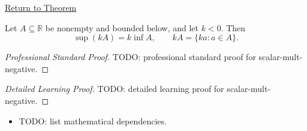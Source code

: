 \newpage
{}
\label{prf:scalar-mult-negative}

\begin{remark*}[Return]
\hyperref[thm:scalar-mult-negative]{Return to Theorem}
\end{remark*}

\begin{theorem*}
Let $A\subseteq\mathbb{R}$ be nonempty and bounded below, and let $k<0$. Then
\[
  \sup(kA)=k\inf A,
  \qquad
  kA=\{ka:a\in A\}.
\]
\end{theorem*}

\begin{proof}[Professional Standard Proof]
\LRAProofBodyStart
TODO: professional standard proof for scalar-mult-negative.
\end{proof}

\begin{proof}[Detailed Learning Proof]
\LRAProofBodyStart
TODO: detailed learning proof for scalar-mult-negative.
\end{proof}

\begin{remark*}
\end{remark*}

\begin{dependencies}
\begin{itemize}
  \item TODO: list mathematical dependencies.
\end{itemize}
\end{dependencies}

\clearpage

